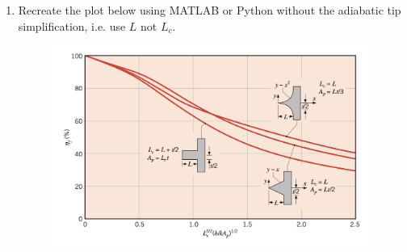 \documentclass[12pt,letterpaper]{article}
\begin{document}
\begin{enumerate}
%
%


\item Recreate the plot below using MATLAB or Python without the adiabatic tip simplification, i.e. use $L$ not $L_c$.

\begin{figure}[!htpb]
	\centering
	\includegraphics[width=0.75\linewidth]{./image4.png}
\end{figure}


\end{enumerate}
\end{document}
